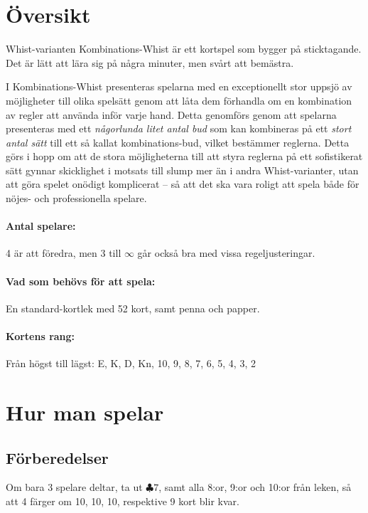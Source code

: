 \documentclass[a4paper]{article}
\author{Av Joakim Nilsson}
\date{Utvecklingsversion (baserad på version \varVersion-\varLanguage) -- \today}
\date{Version \varVersion-\varLanguage\ -- \today}
\begin{document}

	\introPages
	\pagebreak


	\section{Översikt}
	Whist-varianten Kombinations-Whist är ett kortspel som bygger på sticktagande. Det är lätt att lära sig på några minuter, men svårt att bemästra.

	I Kombinations-Whist presenteras spelarna med en exceptionellt stor uppsjö av möjligheter till olika spelsätt genom att låta dem förhandla om en kombination av regler att använda inför varje hand. Detta genomförs genom att spelarna presenteras med ett \emph{någorlunda litet antal bud} som kan kombineras på ett \emph{stort antal sätt} till ett så kallat kombinations-bud, vilket bestämmer reglerna. Detta görs i hopp om att de stora möjligheterna till att styra reglerna på ett sofistikerat sätt gynnar skicklighet i motsats till slump mer än i andra Whist-varianter, utan att göra spelet onödigt komplicerat -- så att det ska vara roligt att spela både för nöjes- och professionella spelare.

	\paragraph{Antal spelare:}
	4 är att föredra, men 3 till $\infty$ går också bra med vissa regeljusteringar.

	\paragraph{Vad som behövs för att spela:}
	En standard-kortlek med 52 kort, samt penna och papper.

	\paragraph{Kortens rang:}
	Från högst till lägst: E, K, D, Kn, 10, 9, 8, 7, 6, 5, 4, 3, 2

	\section{Hur man spelar}
	\subsection{Förberedelser}
	Om bara 3 spelare deltar, ta ut $\clubsuit 7$, samt alla 8:or, 9:or och 10:or från leken, så att 4 färger om 10, 10, 10, respektive 9 kort blir kvar.
\end{document}
